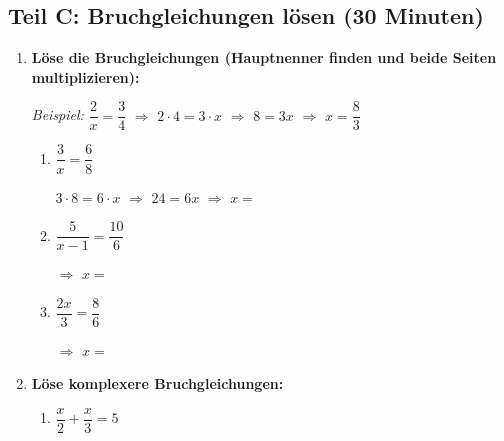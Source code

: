 \subsection*{Teil C: Bruchgleichungen lösen (30 Minuten)}

\begin{enumerate}[label=\arabic*., resume]

    \item \textbf{Löse die Bruchgleichungen (Hauptnenner finden und beide Seiten multiplizieren):}
    \vspace{0.5cm}

    \textit{Beispiel:} $\dfrac{2}{x} = \dfrac{3}{4}$ $\Rightarrow$ $2 \cdot 4 = 3 \cdot x$ $\Rightarrow$ $8 = 3x$ $\Rightarrow$ $x = \dfrac{8}{3}$

    \begin{enumerate}[label=\alph*)]
        \item $\dfrac{3}{x} = \dfrac{6}{8}$
        \vspace{0.3cm}

        $3 \cdot 8 = 6 \cdot x$ $\Rightarrow$ $24 = 6x$ $\Rightarrow$ $x =$ \underline{\hspace{2cm}}

        \vspace{0.5cm}
        \item $\dfrac{5}{x-1} = \dfrac{10}{6}$
        \vspace{0.3cm}

        \underline{\hspace{8cm}} $\Rightarrow$ $x =$ \underline{\hspace{2cm}}

        \vspace{0.5cm}
        \item $\dfrac{2x}{3} = \dfrac{8}{6}$
        \vspace{0.3cm}

        \underline{\hspace{8cm}} $\Rightarrow$ $x =$ \underline{\hspace{2cm}}
    \end{enumerate}

    \vspace{1cm}

    \item \textbf{Löse komplexere Bruchgleichungen:}
    \vspace{0.5cm}

    \begin{enumerate}[label=\alph*)]
        \item $\dfrac{x}{2} + \dfrac{x}{3} = 5$
        \vspace{0.3cm}


\end{enumerate}
\end{enumerate}
